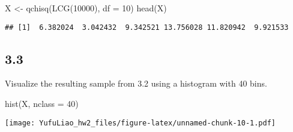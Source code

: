 \documentclass[
]{article}
\newenvironment{Shaded}{\begin{snugshade}}{\end{snugshade}}
\newcommand{\AttributeTok}[1]{\textcolor[rgb]{0.77,0.63,0.00}{#1}}
\newcommand{\DecValTok}[1]{\textcolor[rgb]{0.00,0.00,0.81}{#1}}
\newcommand{\FunctionTok}[1]{\textcolor[rgb]{0.00,0.00,0.00}{#1}}
\newcommand{\NormalTok}[1]{#1}
\newcommand{\OtherTok}[1]{\textcolor[rgb]{0.56,0.35,0.01}{#1}}
\begin{document}
\begin{Shaded}
\begin{Highlighting}[]
\NormalTok{X }\OtherTok{\textless{}{-}} \FunctionTok{qchisq}\NormalTok{(}\FunctionTok{LCG}\NormalTok{(}\DecValTok{10000}\NormalTok{), }\AttributeTok{df =} \DecValTok{10}\NormalTok{)}
\FunctionTok{head}\NormalTok{(X)}
\end{Highlighting}
\end{Shaded}

\begin{verbatim}
## [1]  6.382024  3.042432  9.342521 13.756028 11.820942  9.921533
\end{verbatim}

\hypertarget{section-8}{%
\subsection{3.3}\label{section-8}}

Visualize the resulting sample from 3.2 using a histogram with 40 bins.

\begin{Shaded}
\begin{Highlighting}[]
\FunctionTok{hist}\NormalTok{(X, }\AttributeTok{nclass =} \DecValTok{40}\NormalTok{)}
\end{Highlighting}
\end{Shaded}

\texttt{[image: YufuLiao\_hw2\_files/figure-latex/unnamed-chunk-10-1.pdf]}
\end{document}
